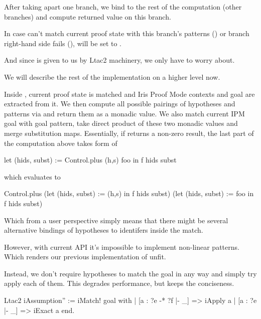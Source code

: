 After taking apart one branch, we bind  to the rest of the computation (other branches) and compute returned value on this branch.

In case  can't match current proof state with this branch's patterns () or branch right-hand side fails (),  will be set to .

And since  is given to us by Ltac2 machinery, we only have  to worry about.

We will describe the rest of the implementation on a higher level now.


Inside , current proof state is matched and Iris Proof Mode contexts and goal are extracted from it.
We then compute all possible pairings of hypotheses and patterns via  and return them as a monadic value.
We also match current IPM goal with goal pattern, take direct product of these two monadic values and merge substitution maps.
Essentially, if  returns a non-zero result, the last part of the computation above takes form of
\begin{coq}
let (hids, subst) := Control.plus (h,s) foo in
f hids subst
\end{coq}
which evaluates to
\begin{coq}
Control.plus
  (let (hids, subst) := (h,s) in
    f hids subst)
  (let (hids, subst) := foo in
   f hids subst)
\end{coq}

Which from a user perspective simply means that there might be several alternative bindings of hypotheses to identifers inside the match.

However, with current API it's impossible to implement non-linear patterns.
Which renders our previous implementation of  unfit.

Instead, we don't require hypotheses to match the goal in any way and simply try apply each of them.
This degrades performance, but keeps the conciseness.
\begin{minipage}{\linewidth}
\begin{coq}
Ltac2 iAssumption'' :=
  iMatch! goal with
  | [a : ?e -* ?f |- _] => iApply a
  | [a : ?e |- _] => iExact a
  end.
\end{coq}
\end{minipage}

